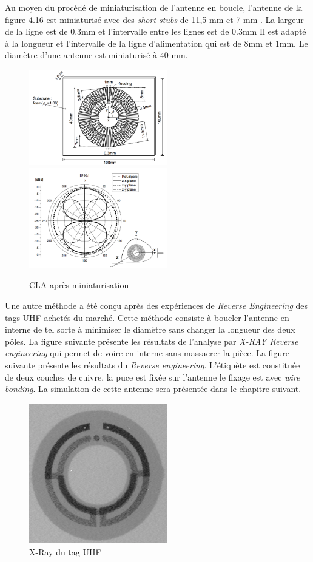 \documentclass[11pt, a4paper, twoside]{book}
\begin{document}
Au moyen du procédé de miniaturisation de l'antenne en boucle, l'antenne de la figure 4.16 est miniaturisé avec des \emph{short stubs} de 11,5 mm et 7 mm . La largeur de la ligne est de 0.3mm et l'intervalle entre les lignes est de 0.3mm
Il est adapté à la longueur et l'intervalle de la ligne d'alimentation qui est de 8mm et 1mm. Le diamètre d'une antenne est miniaturisé à 40 mm.\\
\begin{figure}[H]
\centering
\includegraphics[width=6cm]{structure}
\includegraphics[width=6cm]{structurea}
\caption{CLA après miniaturisation}
\end{figure}

Une autre méthode a été conçu après des expériences de \emph{Reverse Engineering} des tags UHF achetés du marché. Cette méthode consiste à boucler l'antenne en interne de tel sorte à minimiser le diamètre sans changer la longueur des deux pôles. La figure suivante présente les résultats de l'analyse par  \emph{X-RAY Reverse engineering} qui permet de voire en interne sans massacrer la pièce. La figure suivante présente les résultats du \emph{Reverse engineering}. L'étiquète est constituée de deux couches de cuivre, la puce est fixée sur l'antenne le fixage est avec \emph{wire bonding}. La simulation de cette antenne sera présentée dans le chapitre suivant. \\

\begin{figure}[H]
\centering
\includegraphics[width=6cm]{xray}
\caption{X-Ray du tag UHF}
\end{figure}
\end{document}
